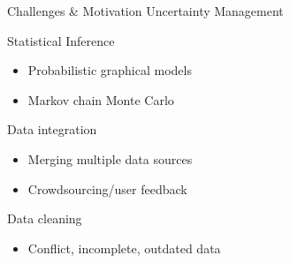 \documentclass[onlymath,xcolor=pdftex,dvipsnames,table]{beamer}
\begin{document}
{
\begin{frame}{Challenges \& Motivation}
{\large Uncertainty Management}
\vspace{-30pt}
\begin{itemize}
  {\bfseries\color{red}
  \item Statistical Inference
    \begin{itemize}\color{red}
      \item Probabilistic graphical models
      \item Markov chain Monte Carlo
    \end{itemize}}
  \item Data integration
    \begin{itemize}
      \item Merging multiple data sources
      \item Crowdsourcing/user feedback
    \end{itemize}
  \item Data cleaning
    \begin{itemize}
      \item Conflict, incomplete, outdated data
    \end{itemize}
\end{itemize}
\end{frame}}
\end{document}
